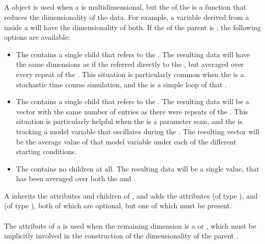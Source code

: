 \begin{blockChanged}
\subsection{}
\label{class:remainingDimension}
\label{class:listOfRemainingDimensions}

A \RemainingDimension object is used when a \Variable is multidimensional, but the  of the \Variable is a function that reduces the dimensionality of the data.  For example, a variable derived from a \Task inside a \RepeatedTask will have the dimensionality of both.  If the  of the parent \Variable is , the following options are available:

\begin{itemize}
        \item The \Variable contains a single \RemainingDimension child that refers to the \Task.  The resulting data will have the same dimensions as if the \Variable referred directly to the \Task, but averaged over every repeat of the \RepeatedTask.  This situation is particularly common when the \Task is a stochastic time course simulation, and the \RepeatedTask is a simple loop of that \Task.
        \item The \Variable contains a single \RemainingDimension child that refers to the \RepeatedTask.  The resulting data will be a vector with the same number of entries as there were repeats of the \RepeatedTask.  This situation is particularly helpful when the \RepeatedTask is a parameter scan, and the \Variable is tracking a model variable that oscillates during the \Task.  The resulting vector will be the average value of that model variable under each of the different starting conditions.
        \item The \Variable contains no \RemainingDimension children at all.  The resulting data will be a single value, that has been averaged over both the \Task and \RepeatedTask.
\end{itemize}

A \RemainingDimension inherits the attributes and children of \SedBase, and adds the attributes  (of type ), and  (of type ), both of which are optional, but one of which must be present.

\paragraph*{}
The  attribute of a \RemainingDimension is used when the remaining dimension is a \Task or \RepeatedTask, which must be implicitly involved in the construction of the dimensionality of the parent \Variable.


\end{blockChanged}
